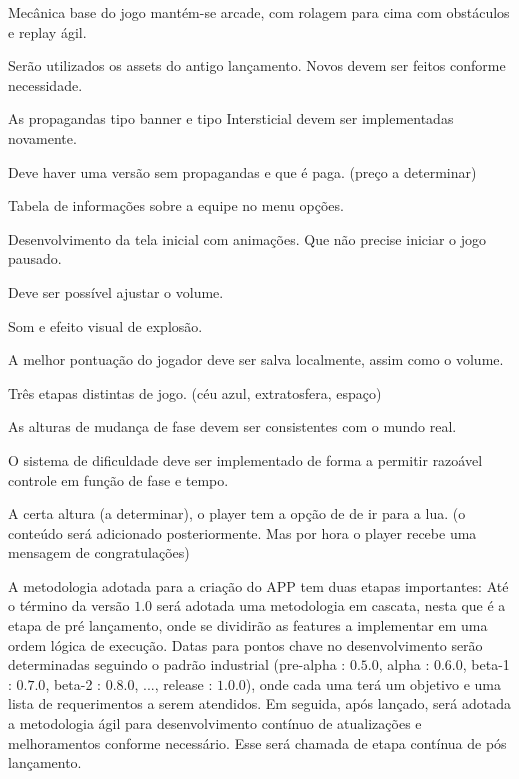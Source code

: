 {    \begin{description}[font=$\bullet$~\normalfont\scshape]
        \item [Arcade] Mecânica base do jogo mantém-se arcade, com rolagem para cima com obstáculos e replay ágil.
        \item [Assests reutilizados] Serão utilizados os assets do antigo lançamento. Novos devem ser feitos conforme necessidade.
        \item [Propaganda] As propagandas tipo banner e tipo Intersticial devem ser implementadas novamente.
        \item [Versão paga] Deve haver uma versão sem propagandas e que é paga. (preço a determinar)
        \item [Tabela Info] Tabela de informações sobre a equipe no menu opções.
        \item [Tela inicial] Desenvolvimento da tela inicial com animações. Que não precise iniciar o jogo pausado.
        \item [Volume] Deve ser possível ajustar o volume.
        \item [Explosão] Som e efeito visual de explosão.
        \item [Salvar] A melhor pontuação do jogador deve ser salva localmente, assim como o volume.
        \item [3 fases] Três etapas distintas de jogo. (céu azul, extratosfera, espaço)
        \item [Alturas reais] As alturas de mudança de fase devem ser consistentes com o mundo real.
        \item [Dificuldade crescente] O sistema de dificuldade deve ser implementado de forma a permitir razoável controle em função de fase e tempo.
        \item [Fase final] A certa altura (a determinar), o player tem a opção de de ir para a lua. (o conteúdo será adicionado posteriormente. Mas por hora o player recebe uma mensagem de congratulações)
    \end{description}

    A metodologia adotada para a criação do APP tem duas etapas importantes: Até o término da versão $1.0$ será adotada uma metodologia em cascata, nesta que é a etapa de pré lançamento, onde se dividirão as features a implementar em uma ordem lógica de execução. 
    Datas para pontos chave no desenvolvimento serão determinadas seguindo o padrão industrial (pre-alpha : $0.5.0$, alpha : $0.6.0$, beta-1 : $0.7.0$, beta-2 : $0.8.0$, ..., release : $1.0.0$), onde cada uma terá um objetivo e uma lista de requerimentos a serem atendidos.
    Em seguida, após lançado, será adotada a metodologia ágil para desenvolvimento contínuo de atualizações e melhoramentos conforme necessário. Esse será chamada de etapa contínua de pós lançamento.

}
